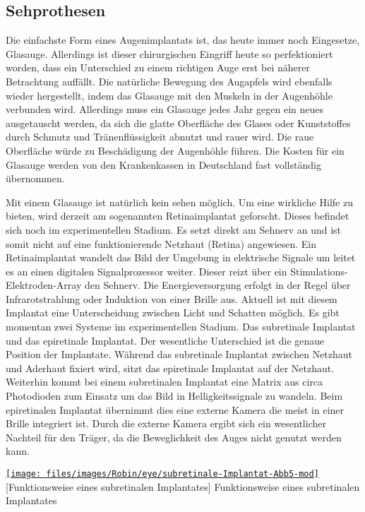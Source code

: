 \subsection{Sehprothesen}
\label{sec:Robin:topical:visual_prosthesis}
Die einfachste Form eines Augenimplantats ist, das heute immer noch Eingesetze, Glasauge. Allerdings
ist dieser chirurgischen Eingriff heute so perfektioniert worden, dass ein Unterschied zu einem
richtigen Auge erst bei näherer Betrachtung auffällt. Die natürliche Bewegung des Augapfels wird
ebenfalls wieder hergestellt, indem das Glasauge mit den Muskeln in der Augenhöhle verbunden wird.
Allerdings muss ein Glasauge jedes Jahr gegen ein neues ausgetauscht werden, da sich die glatte
Oberfläche des Glases oder Kunststoffes durch Schmutz und Tränenflüssigkeit abnutzt und rauer
wird. Die raue Oberfläche würde zu Beschädigung der Augenhöhle führen.
Die Kosten für ein Glasauge werden von den Krankenkassen in Deutschland fast vollständig übernommen.

Mit einem Glasauge ist natürlich kein sehen möglich. Um eine wirkliche Hilfe zu bieten, wird derzeit
am sogenannten Retinaimplantat geforscht. Dieses befindet sich noch im experimentellen Stadium.
Es setzt direkt am
Sehnerv an und ist somit nicht auf eine funktionierende Netzhaut (Retina) angewiesen. Ein
Retinaimplantat wandelt das Bild der Umgebung in elektrische Signale um leitet es an einen digitalen
Signalprozessor weiter. Dieser reizt über ein Stimulations-Elektroden-Array den Sehnerv. Die
Energieversorgung erfolgt in der Regel über Infrarotstrahlung oder Induktion von einer Brille aus.
Aktuell ist mit diesem Implantat eine Unterscheidung zwischen Licht und Schatten möglich. Es gibt
momentan zwei Systeme im experimentellen Stadium. Das subretinale Implantat und das epiretinale
Implantat. Der wesentliche Unterschied ist die genaue Position der Implantate. Während das
subretinale Implantat zwischen Netzhaut und Aderhaut fixiert wird, sitzt das epiretinale Implantat
auf der Netzhaut. Weiterhin kommt bei einem subretinalen Implantat eine Matrix aus circa
 Photodioden zum Einsatz um das Bild in Helligkeitssignale zu wandeln. Beim
epiretinalen
Implantat übernimmt dies eine externe Kamera die meist in einer Brille integriert ist. Durch die
externe Kamera ergibt sich ein wesentlicher Nachteil für den Träger, da die Beweglichkeit des Auges
nicht genutzt werden kann.

\begin{figurewrapper}
	\href{http://www.oe.uni-duisburg-essen.de/latestnews/augenblicke/Abb5.jpg}{%
		\texttt{[image: files/images/Robin/eye/subretinale-Implantat-Abb5-mod]}%
	}
	[Funktionsweise eines subretinalen Implantates]%
		{Funktionsweise eines subretinalen Implantates\footnotemark}
	\label{fig:Subretinal_Implant}
\end{figurewrapper}

